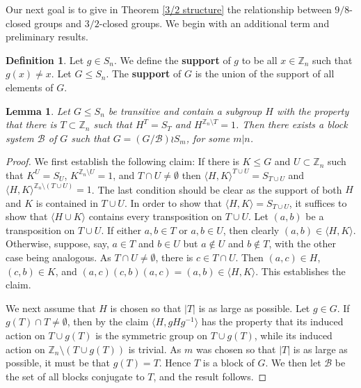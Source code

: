 \documentclass{amsart}
\newtheorem{lem}[thrm]{Lemma}
\theoremstyle{definition}
\newtheorem{definition}[thrm]{Definition}
\theoremstyle{remark}
\numberwithin{equation}{section}
\def\Z{{\mathbb Z}}
\def\la{{\langle}}
\def\ra{{\rangle}}
\def\cal{\mathcal}
\begin{document}
Our next goal is to give in Theorem \ref{3/2 structure} the relationship between $9/8$-closed groups and $3/2$-closed groups.  We begin with an additional term and preliminary results.

\begin{definition}
Let $g\in S_n$.  We define the {\bf support} of $g$ to be all $x\in\Z_n$ such that $g(x)\not = x$.  Let $G\le S_n$.  The {\bf support} of $G$ is the union of the support of all elements of $G$.
\end{definition}

\begin{lem}\label{maximal symmetric}
Let $G\le S_n$ be transitive and contain a subgroup $H$ with the property that there is $T\subset\Z_n$ such that $H^T = S_T$ and $H^{\Z_n\setminus T} = 1$.  Then there exists a block system ${\cal B}$ of $G$ such that $G = (G/{\cal B})\wr S_m$, for some $m\vert n$.
\end{lem}

\begin{proof}
We first establish the following claim: If there is $K\le G$ and $U\subset\Z_n$ such that $K^U = S_U$, $K^{\Z_n\setminus U} = 1$, and $T\cap U\not = \emptyset$ then $\la H,K\ra^{T\cup U} = S_{T\cup U}$ and $\la H,K\ra^{\Z_n\setminus (T\cup U)} = 1$.  The last condition should be clear as the support of both $H$ and $K$ is contained in $T\cup U$.  In order to show that $\la H,K\ra = S_{T\cup U}$, it suffices to show that $\la H\cup K\ra$ contains every transposition on $T\cup U$.  Let $(a,b)$ be a transposition on $T\cup U$.  If either $a,b\in T$ or $a,b\in U$, then clearly $(a,b)\in \la H,K\ra$.  Otherwise, suppose, say, $a\in T$ and $b\in U$ but $a\not\in U$ and $b\not \in T$, with the other case being analogous.  As $T\cap U\not = \emptyset$, there is $c\in T\cap U$.  Then $(a,c)\in H$, $(c,b)\in K$, and $(a,c)(c,b)(a,c) = (a,b)\in \la H,K\ra$.  This establishes the claim.

We next assume that $H$ is chosen so that $\vert T\vert$ is as large as possible.  Let $g\in G$.  If $g(T)\cap T\not = \emptyset$, then by the claim $\la H,gHg^{-1}\ra$ has the property that its induced action on $T\cup g(T)$ is the symmetric group on $T\cup g(T)$, while its induced action on $\Z_n\setminus (T\cup g(T))$ is trivial.  As $m$ was chosen so that $\vert T\vert$ is as large as possible, it must be that $g(T) = T$.  Hence $T$ is a block of $G$.  We then let ${\cal B}$ be the set of all blocks conjugate to $T$, and the result follows.
\end{proof}
\end{document}
